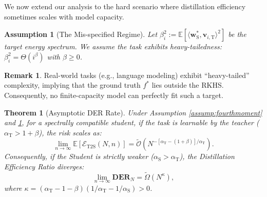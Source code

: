 \documentclass{article}
\theoremstyle{definition}
\theoremstyle{definition}
\newtheorem{remark}{Remark}
\theoremstyle{plain}
\newtheorem{theorem}{Theorem}
\theoremstyle{plain}
\newtheorem{assumption}{Assumption}
\theoremstyle{plain}
\theoremstyle{plain}
\theoremstyle{plain}
\newcommand{\Ex}{\mathbb{E}}
\newcommand{\te}{\mathrm{T}}
\newcommand{\st}{\mathrm{S}}
\begin{document}
We now extend our analysis to the hard scenario where distillation efficiency sometimes scales with model capacity.


\begin{assumption}[The Mis-specified Regime]
\label{assump:hard_task}
Let $\beta_i^2 := \Ex[{\langle \mathbf{w}_\st^*, \mathbf{v}_{i,\te} \rangle^2}]$ be the target energy spectrum. We assume the task exhibits heavy-tailedness: $\beta_i^2 = \Theta(i^{\beta})$ with $\beta \geq 0$.
\end{assumption}

\begin{remark}
Real-world tasks (e.g., language modeling) exhibit ``heavy-tailed'' complexity, implying that the ground truth $f^*$ lies outside the RKHS. Consequently, no finite-capacity model can perfectly fit such a target. 
\end{remark}

\begin{theorem}[Asymptotic DER Rate]
\label{thm:der_rate}
    Under Assumption \ref{assump:fourthmoment} and \ref{assump:hard_task}, for a spectrally compatible student, if the task is learnable by the teacher ($\alpha_\te > 1+\beta$), the risk scales as:
    \begin{equation}
    \lim_{n\rightarrow\infty}\mathbb{E}[\mathcal{E}_{\mathrm{T2S}}(N,n)] = \widetilde{\mathcal{O}}(N^{-[\alpha_\te - (1+\beta)]/\alpha_\te}).
    \end{equation}
    Consequently, if the Student is strictly weaker ($\alpha_\st > \alpha_\te$), the Distillation Efficiency Ratio diverges:
    \begin{equation}
        \lim_{n\to\infty}\mathbf{DER}_N = \widetilde{{\Omega}}(N^{\kappa}),
    \end{equation} 
    where $\kappa = (\alpha_\te-1-\beta)\left(1/{\alpha_\te}-1/{\alpha_\st}\right) > 0$.
\end{theorem}
\end{document}
